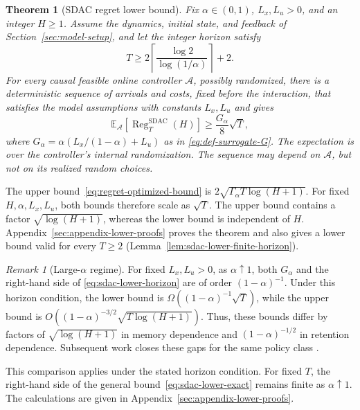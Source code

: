 \documentclass[journal]{IEEEtran}
\newtheorem{theorem}{Theorem}
\theoremstyle{remark}
\newtheorem{remark}{Remark}
\newcommand{\RegSDAC}[1]{\operatorname{Reg}_{#1}^{\mathrm{SDAC}}}
\begin{document}
\begin{theorem}[SDAC regret lower bound]
\label{thm:sdac-lower-bound}
Fix $\alpha\in(0,1)$, $L_x,L_u>0$, and an integer $H\ge1$.
Assume the dynamics, initial state, and feedback of
Section~\ref{sec:model-setup}, and let the integer horizon satisfy
\begin{equation}
\label{eq:sdac-lower-horizon}
T\ge2\left\lceil\frac{\log 2}{\log(1/\alpha)}\right\rceil+2.
\end{equation}
For every causal feasible online controller $\mathcal{A}$, possibly
randomized, there is a deterministic sequence of arrivals and costs,
fixed before the interaction, that satisfies the model assumptions with
constants $L_x,L_u$ and gives
\begin{equation}
\label{eq:sdac-lower-simplified}
\mathbb{E}_{\mathcal{A}}\!\left[\RegSDAC{T}(H)\right]
\ge\frac{G_\alpha}{8}\sqrt{T},
\end{equation}
where $G_\alpha=\alpha(L_x/(1-\alpha)+L_u)$ as in
\eqref{eq:def-surrogate-G}.
The expectation is over the controller's internal randomization.
The sequence may depend on $\mathcal{A}$, but not on its realized random
choices.
\end{theorem}

The upper bound~\eqref{eq:regret-optimized-bound} is
$2\sqrt{\Gamma_\alpha T\log(H+1)}$. For fixed $H,\alpha,L_x,L_u$,
both bounds therefore scale as $\sqrt{T}$. The upper bound contains a
factor $\sqrt{\log(H+1)}$, whereas the lower bound is independent of $H$.
Appendix~\ref{sec:appendix-lower-proofs} proves the theorem and also gives
a lower bound valid for every $T\ge2$
(Lemma~\ref{lem:sdac-lower-finite-horizon}).

\begin{remark}[Large-$\alpha$ regime]
\label{rem:large-alpha-regime}
For fixed $L_x,L_u>0$, as $\alpha\uparrow1$, both $G_\alpha$ and the
right-hand side of \eqref{eq:sdac-lower-horizon} are of order
$(1-\alpha)^{-1}$. Under this horizon condition, the lower bound is
$\Omega((1-\alpha)^{-1}\sqrt{T})$, while the upper bound is
$O((1-\alpha)^{-3/2}\sqrt{T\log(H+1)})$.
Thus, these bounds differ by factors of $\sqrt{\log(H+1)}$ in memory
dependence and $(1-\alpha)^{-1/2}$ in retention dependence.
Subsequent work closes these gaps for the same policy class
\cite{asgari2026cumulative}.

This comparison applies under the stated horizon condition. For fixed $T$,
the right-hand side of the general bound~\eqref{eq:sdac-lower-exact}
remains finite as $\alpha\uparrow1$.
The calculations are given in Appendix~\ref{sec:appendix-lower-proofs}.
\end{remark}
\end{document}

